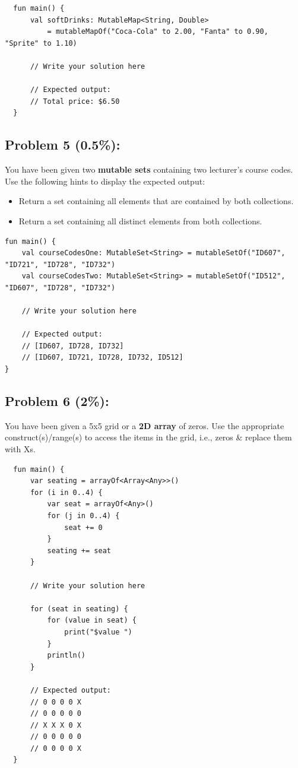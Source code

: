\documentclass{article}
\begin{document}
\begin{verbatim}
  fun main() {
      val softDrinks: MutableMap<String, Double> 
          = mutableMapOf("Coca-Cola" to 2.00, "Fanta" to 0.90, "Sprite" to 1.10)

      // Write your solution here
			
      // Expected output:
      // Total price: $6.50
  }
\end{verbatim}

\subsection*{Problem 5 (0.5\%):} You have been given two \textbf{mutable sets} containing two lecturer's course codes. Use the following hints to display the expected output:
\begin{itemize}
  \item Return a set containing all elements that are contained by both collections.
  \item Return a set containing all distinct elements from both collections.
\end{itemize}

\begin{verbatim}
fun main() {
    val courseCodesOne: MutableSet<String> = mutableSetOf("ID607", "ID721", "ID728", "ID732")
    val courseCodesTwo: MutableSet<String> = mutableSetOf("ID512", "ID607", "ID728", "ID732")
    
    // Write your solution here
    
    // Expected output:
    // [ID607, ID728, ID732]
    // [ID607, ID721, ID728, ID732, ID512] 
}
\end{verbatim}

\subsection*{Problem 6 (2\%):}
You have been given a 5x5 grid or a \textbf{2D array} of zeros. Use the appropriate construct(s)/range(s) to access the items in the grid, i.e., zeros \& replace them with Xs.

\begin{verbatim}
  fun main() {
      var seating = arrayOf<Array<Any>>()
      for (i in 0..4) {
          var seat = arrayOf<Any>()
          for (j in 0..4) {
              seat += 0
          }
          seating += seat
      }

      // Write your solution here

      for (seat in seating) {
          for (value in seat) {
              print("$value ")
          }
          println()
      }

      // Expected output:
      // 0 0 0 0 X 
      // 0 0 0 0 0 
      // X X X 0 X 
      // 0 0 0 0 0 
      // 0 0 0 0 X
  }
\end{verbatim}
\end{document}
